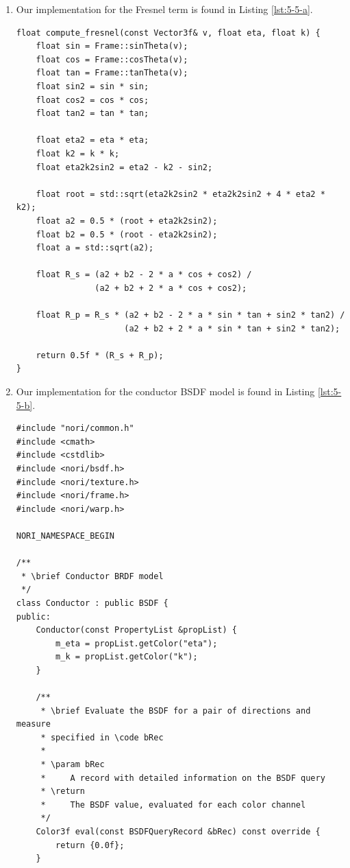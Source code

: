 \begin{enumerate}
\item %

Our implementation for the Fresnel term is found in Listing \ref{lst:5-5-a}.

\begin{lstlisting}[caption={Function to compute the Fresnel term},label={lst:5-5-a}]
float compute_fresnel(const Vector3f& v, float eta, float k) {
    float sin = Frame::sinTheta(v);
    float cos = Frame::cosTheta(v);
    float tan = Frame::tanTheta(v);
    float sin2 = sin * sin;
    float cos2 = cos * cos;
    float tan2 = tan * tan;

    float eta2 = eta * eta;
    float k2 = k * k;
    float eta2k2sin2 = eta2 - k2 - sin2;

    float root = std::sqrt(eta2k2sin2 * eta2k2sin2 + 4 * eta2 * k2);
    float a2 = 0.5 * (root + eta2k2sin2);
    float b2 = 0.5 * (root - eta2k2sin2);
    float a = std::sqrt(a2);

    float R_s = (a2 + b2 - 2 * a * cos + cos2) /
                (a2 + b2 + 2 * a * cos + cos2);

    float R_p = R_s * (a2 + b2 - 2 * a * sin * tan + sin2 * tan2) /
                      (a2 + b2 + 2 * a * sin * tan + sin2 * tan2);

    return 0.5f * (R_s + R_p);
}
\end{lstlisting}

\item %

Our implementation for the conductor BSDF model is found in Listing \ref{lst:5-5-b}.

\begin{lstlisting}[caption={Our implementation for the conductor BSDF model},label={lst:5-5-b}]
#include "nori/common.h"
#include <cmath>
#include <cstdlib>
#include <nori/bsdf.h>
#include <nori/texture.h>
#include <nori/frame.h>
#include <nori/warp.h>

NORI_NAMESPACE_BEGIN

/**
 * \brief Conductor BRDF model
 */
class Conductor : public BSDF {
public:
    Conductor(const PropertyList &propList) {
        m_eta = propList.getColor("eta");
        m_k = propList.getColor("k");
    }

    /**
     * \brief Evaluate the BSDF for a pair of directions and measure
     * specified in \code bRec
     *
     * \param bRec
     *     A record with detailed information on the BSDF query
     * \return
     *     The BSDF value, evaluated for each color channel
     */
    Color3f eval(const BSDFQueryRecord &bRec) const override {
        return {0.0f};
    }


\end{lstlisting}
\end{enumerate}
